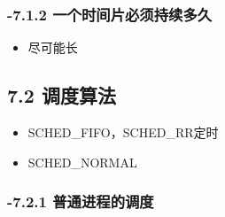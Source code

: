 \documentclass[11pt]{article}
\begin{document}
\subsubsection{-7.1.2 一个时间片必须持续多久}
\label{sec-2.1.2}

\begin{itemize}
\item 尽可能长
\end{itemize}
\subsection{7.2 调度算法}
\label{sec-2.2}

\begin{itemize}
\item SCHED\_FIFO，SCHED\_RR定时
\item SCHED\_NORMAL
\end{itemize}
\subsubsection{-7.2.1 普通进程的调度}
\label{sec-2.2.1}
\end{document}
